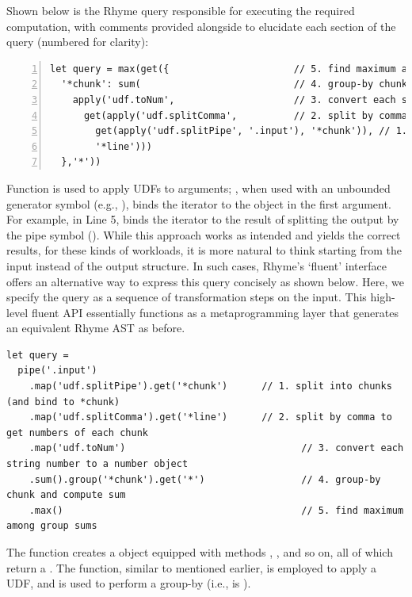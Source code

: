 \documentclass[runningheads]{llncs}
\newcommand{\lang}{Rhyme}
\begin{document}
Shown below is the \lang{} query responsible for executing the required
computation, with comments provided alongside to elucidate each section
of the query (numbered for clarity):

\begin{lstlisting}[style=JavaScript, columns=flexible, numbers=left]
let query = max(get({                      // 5. find maximum among group sums
  '*chunk': sum(                           // 4. group-by chunk and compute sum
    apply('udf.toNum',                     // 3. convert each string number to a number object
      get(apply('udf.splitComma',          // 2. split by comma to get numbers of each chunk
        get(apply('udf.splitPipe', '.input'), '*chunk')), // 1. split into chunks
        '*line')))
  },'*'))
\end{lstlisting}

Function  is used to apply UDFs to arguments;
, when used with an unbounded generator symbol (e.g., ), binds the
iterator to the object in the first argument.
For example, in Line 5,  binds the iterator
 to the result of splitting the output by the pipe symbol (\inline{|}).
While this approach works as intended and yields the correct results, 
for these kinds of workloads, it is more natural to think starting from the input
instead of the output structure.
In such cases, \lang{}'s `fluent' interface offers an alternative way to express
this query concisely as shown below.
Here, we specify the query as a sequence of transformation steps on the input.
This high-level fluent API essentially functions as a metaprogramming layer
that generates an equivalent \lang{} AST as before.

\begin{lstlisting}[style=JavaScript, columns=flexible]
let query =
  pipe('.input')
    .map('udf.splitPipe').get('*chunk')      // 1. split into chunks (and bind to *chunk)
    .map('udf.splitComma').get('*line')      // 2. split by comma to get numbers of each chunk
    .map('udf.toNum')                               // 3. convert each string number to a number object
    .sum().group('*chunk').get('*')                 // 4. group-by chunk and compute sum
    .max()                                          // 5. find maximum among group sums
\end{lstlisting}

The  function creates a  object equipped with
methods , , and so on, all of which return a
.
The  function, similar to  mentioned earlier,
is employed to apply a UDF, and  is used to perform a group-by
(i.e.,  is ).
\end{document}
